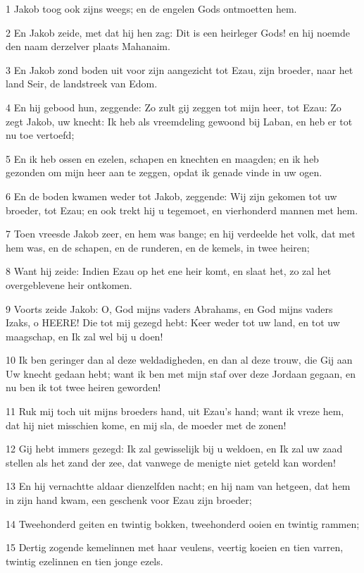 \par 1 Jakob toog ook zijns weegs; en de engelen Gods ontmoetten hem.
\par 2 En Jakob zeide, met dat hij hen zag: Dit is een heirleger Gods! en hij noemde den naam derzelver plaats Mahanaim.
\par 3 En Jakob zond boden uit voor zijn aangezicht tot Ezau, zijn broeder, naar het land Seir, de landstreek van Edom.
\par 4 En hij gebood hun, zeggende: Zo zult gij zeggen tot mijn heer, tot Ezau: Zo zegt Jakob, uw knecht: Ik heb als vreemdeling gewoond bij Laban, en heb er tot nu toe vertoefd;
\par 5 En ik heb ossen en ezelen, schapen en knechten en maagden; en ik heb gezonden om mijn heer aan te zeggen, opdat ik genade vinde in uw ogen.
\par 6 En de boden kwamen weder tot Jakob, zeggende: Wij zijn gekomen tot uw broeder, tot Ezau; en ook trekt hij u tegemoet, en vierhonderd mannen met hem.
\par 7 Toen vreesde Jakob zeer, en hem was bange; en hij verdeelde het volk, dat met hem was, en de schapen, en de runderen, en de kemels, in twee heiren;
\par 8 Want hij zeide: Indien Ezau op het ene heir komt, en slaat het, zo zal het overgeblevene heir ontkomen.
\par 9 Voorts zeide Jakob: O, God mijns vaders Abrahams, en God mijns vaders Izaks, o HEERE! Die tot mij gezegd hebt: Keer weder tot uw land, en tot uw maagschap, en Ik zal wel bij u doen!
\par 10 Ik ben geringer dan al deze weldadigheden, en dan al deze trouw, die Gij aan Uw knecht gedaan hebt; want ik ben met mijn staf over deze Jordaan gegaan, en nu ben ik tot twee heiren geworden!
\par 11 Ruk mij toch uit mijns broeders hand, uit Ezau's hand; want ik vreze hem, dat hij niet misschien kome, en mij sla, de moeder met de zonen!
\par 12 Gij hebt immers gezegd: Ik zal gewisselijk bij u weldoen, en Ik zal uw zaad stellen als het zand der zee, dat vanwege de menigte niet geteld kan worden!
\par 13 En hij vernachtte aldaar dienzelfden nacht; en hij nam van hetgeen, dat hem in zijn hand kwam, een geschenk voor Ezau zijn broeder;
\par 14 Tweehonderd geiten en twintig bokken, tweehonderd ooien en twintig rammen;
\par 15 Dertig zogende kemelinnen met haar veulens, veertig koeien en tien varren, twintig ezelinnen en tien jonge ezels.
